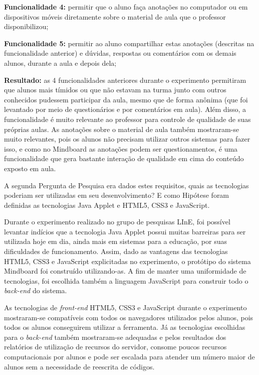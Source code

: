 \textbf{Funcionalidade 4:} permitir que o aluno faça anotações no computador ou em dispositivos móveis diretamente sobre o material de aula que o professor disponibilizou;

\textbf{Funcionalidade 5:} permitir ao aluno compartilhar estas anotações (descritas na funcionalidade anterior) e dúvidas, respostas ou comentários com os demais alunos, durante a aula e depois dela;


\textbf{Resultado:} as 4 funcionalidades anteriores durante o experimento permitiram que alunos mais tímidos ou que não estavam na turma junto com outros conhecidos pudessem participar da aula, mesmo que de forma anônima (que foi levantado por meio de questionários e por comentários em aula). Além disso, a funcionalidade é muito relevante ao professor para controle de qualidade de suas próprias aulas. 
As anotações sobre o material de aula também mostraram-se muito relevantes, pois os alunos não precisam utilizar outros sistemas para fazer isso, e como no Mindboard as anotações podem ser questionamentos, é uma funcionalidade que gera bastante interação de qualidade em cima do conteúdo exposto em aula.

A segunda Pergunta de Pesquisa era dados estes requisitos, quais as tecnologias poderiam ser utilizadas em seu desenvolvimento? E como Hipótese foram definidas as tecnologias Java Applet e HTML5, CSS3 e JavaScript.

Durante o experimento realizado no grupo de pesquisas LInE, foi possível levantar indícios que a tecnologia Java Applet possui muitas barreiras para ser utilizada hoje em dia, ainda mais em sistemas para a educação, por suas dificuldades de funcionamento. Assim, dado as vantagens das tecnologias HTML5, CSS3 e JavaScript explicitadas no experimento, o protótipo do sistema Mindboard foi construído utilizando-as. A fim de manter uma uniformidade de tecnologias, foi escolhida também a linguagem JavaScript para construir todo o \emph{back-end} do sistema.

As tecnologias de \emph{front-end} HTML5, CSS3 e JavaScript durante o experimento mostraram-se compatíveis com todos os navegadores utilizados pelos alunos, pois todos os alunos conseguirem utilizar a ferramenta. Já as tecnologias escolhidas para o \emph{back-end} também mostraram-se adequadas e pelos resultados dos relatórios de utilização de recursos do servidor, consome poucos recursos computacionais por alunos e pode ser escalada para atender um número maior de alunos sem a necessidade de reescrita de códigos.

